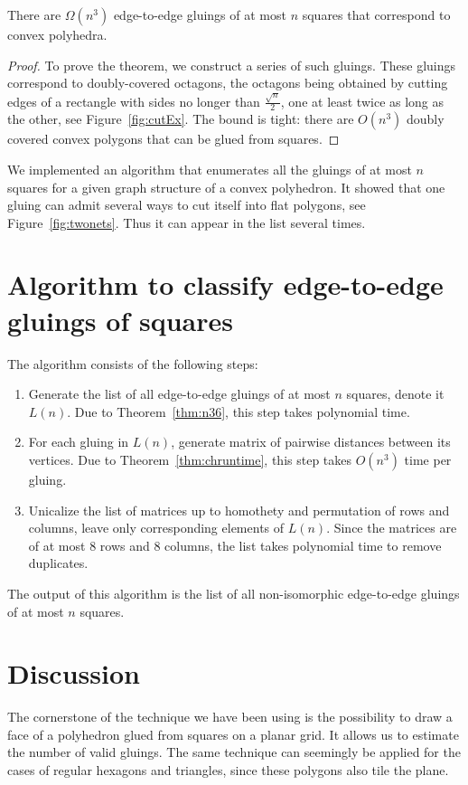\documentclass[a4paper,USenglish,cleveref, autoref, thm-restate]{socg-lipics-v2019}
\begin{document}


\begin{theorem} \label{thm:n52}
	There are $\Omega \left( n^3 \right)$ edge-to-edge gluings of at most $n$ squares that correspond to convex polyhedra.
\end{theorem}

\begin{proof}
	To prove the theorem, we construct a series of such gluings. These gluings correspond to doubly-covered octagons, the octagons being obtained by cutting edges of a rectangle with sides no longer than $\frac{\sqrt{n}}{2}$, one at least twice as long as the other, see Figure~\ref{fig:cutEx}. The bound is tight: there are $O(n^3)$ doubly covered convex polygons that can be glued from squares.
\end{proof}



We implemented an algorithm that enumerates all the gluings of at most $n$ squares for a given graph structure of a convex polyhedron. It showed that one gluing can admit several ways to cut itself into flat polygons, see Figure~\ref{fig:twonets}. Thus it can appear in the list several times.



\section{Algorithm to classify edge-to-edge gluings of squares}

The algorithm consists of the following steps:

\begin{enumerate}
	\item Generate the list of all edge-to-edge gluings of at most $n$ squares,
	denote it $L(n)$. Due to Theorem~\ref{thm:n36}, this step takes polynomial time.
	\item For each gluing in $L(n)$, generate matrix of pairwise distances
	between its vertices. Due to Theorem~\ref{thm:chruntime},
	this step takes $O(n^3)$ time per gluing.
	\item Unicalize the list of matrices up to homothety and permutation of rows and columns, leave only corresponding elements of $L(n)$. Since the matrices are of at most 8 rows and 8 columns, the list takes polynomial time to remove duplicates.
\end{enumerate}

The output of this algorithm is the list of all non-isomorphic edge-to-edge gluings of at most $n$ squares.

\section{Discussion}

The cornerstone of the technique we have been using is the possibility to draw a face of a polyhedron glued from squares on a planar grid. It allows us to estimate the number of valid gluings. The same technique can seemingly be applied for the cases of regular hexagons and triangles, since these polygons also tile the plane.


\end{document}
